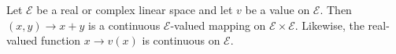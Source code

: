 Let $\mathcal{E}$ be a real or complex linear space and let $v$ be a value on $\mathcal{E}$. Then $(x, y) \rightarrow x + y$ is a continuous $\mathcal{E}$-valued mapping on $\mathcal{E} \times \mathcal{E}$. Likewise, the real-valued function $x \rightarrow v(x)$ is continuous on $\mathcal{E}$.
